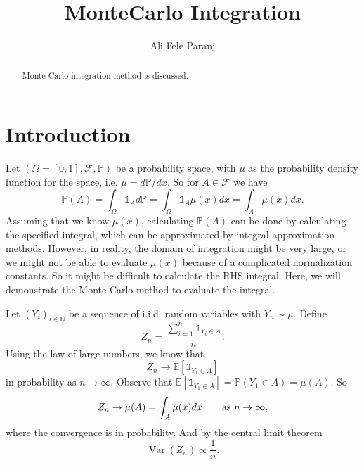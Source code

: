 \documentclass[11pt,a4paper]{article}
\title{MonteCarlo Integration}
\author{Ali Fele Paranj}
\theoremstyle{definition}
\theoremstyle{Example}
\newcommand{\Prob}{\mathbb{P}}
\newcommand{\N}{\mathbb{N}}
\newcommand{\E}{\mathbb{E}}
\begin{document}
	\maketitle
	\begin{abstract}
		Monte Carlo integration method is discussed.
	\end{abstract}
	
	\section{Introduction}
	Let $ (\Omega=[0,1],\mathcal{F},\Prob) $ be a probability space, with $ \mu $ as the probability density function for the space, i.e. $\mu = d\Prob/dx $. So for $ A \in \mathcal{F} $ we have
	\[  \Prob(A) = \int_\Omega \mathds{1}_A d\Prob = \int_\Omega \mathds{1}_A \mu(x) dx = \int_A \mu(x)dx. \]
	Assuming that we know $ \mu(x) $, calculating $ \Prob(A) $ can be done by calculating the specified integral, which can be approximated by integral approximation methods. However, in reality, the domain of integration might be very large, or we might not be able to evaluate $ \mu(x) $ because of a complicated normalization constants. So it might be difficult to calculate the RHS integral. Here, we will demonstrate the Monte Carlo method to evaluate the integral.
	
	Let $ (Y_i)_{i\in\N} $ be a sequence of i.i.d. random variables with $ Y_n \sim \mu $. Define
	\[ Z_n = \frac{\sum_{i=1}^n \mathds{1}_{Y_i\in A}}{n}. \]
	Using the law of large numbers, we know that
	\[ Z_n \to \E[\mathds{1}_{Y_1\in A}]  \]
	in probability as $ n\to\infty $. Observe that $ \E[\mathds{1}_{Y_1\in A}] = \Prob(Y_1\in A) = \mu(A) $. So
	\[ Z_n \to \mu(A) = \int_A\mu(x)dx \qquad \text{as $ n\to \infty $}, \]
	where the convergence is in probability. And by the central limit theorem 
	\[ \operatorname{Var}(Z_n) \propto \frac{1}{n}. \]
	
\end{document}

